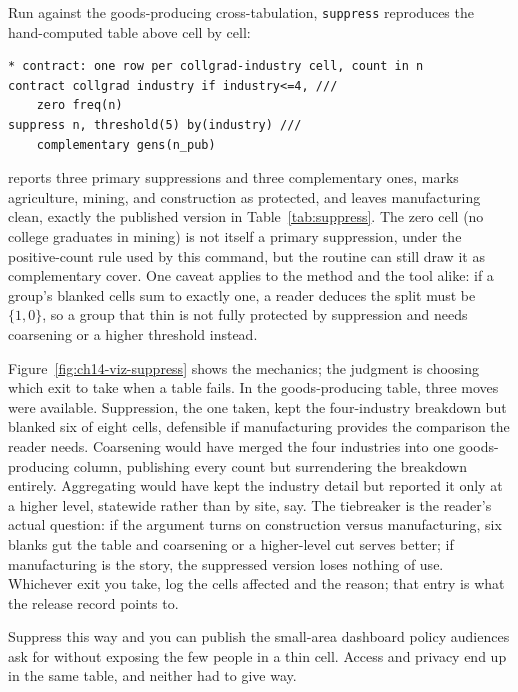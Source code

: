 \documentclass[
    a4paper,
    fontsize=10pt,
    twoside=true,
    numbers=noenddot,
]{kaobook}
\begin{document}
Run against the goods-producing cross-tabulation, \texttt{suppress} reproduces the hand-computed table above cell by cell:
\par
{\footnotesize
\begin{verbatim}
* contract: one row per collgrad-industry cell, count in n
contract collgrad industry if industry<=4, ///
    zero freq(n)
suppress n, threshold(5) by(industry) ///
    complementary gens(n_pub)
\end{verbatim}
}
reports three primary suppressions and three complementary ones, marks agriculture, mining, and construction as protected, and leaves manufacturing clean, exactly the published version in Table~\ref{tab:suppress}. The zero cell (no college graduates in mining) is not itself a primary suppression, under the positive-count rule used by this command, but the routine can still draw it as complementary cover. One caveat applies to the method and the tool alike: if a group's blanked cells sum to exactly one, a reader deduces the split must be $\{1,0\}$, so a group that thin is not fully protected by suppression and needs coarsening or a higher threshold instead.

Figure~\ref{fig:ch14-viz-suppress} shows the mechanics; the judgment is choosing which exit to take when a table fails. In the goods-producing table, three moves were available. Suppression, the one taken, kept the four-industry breakdown but blanked six of eight cells, defensible if manufacturing provides the comparison the reader needs. Coarsening would have merged the four industries into one goods-producing column, publishing every count but surrendering the breakdown entirely. Aggregating would have kept the industry detail but reported it only at a higher level, statewide rather than by site, say. The tiebreaker is the reader's actual question: if the argument turns on construction versus manufacturing, six blanks gut the table and coarsening or a higher-level cut serves better; if manufacturing is the story, the suppressed version loses nothing of use. Whichever exit you take, log the cells affected and the reason; that entry is what the release record points to.

Suppress this way and you can publish the small-area dashboard policy audiences ask for without exposing the few people in a thin cell. Access and privacy end up in the same table, and neither had to give way.
\end{document}
